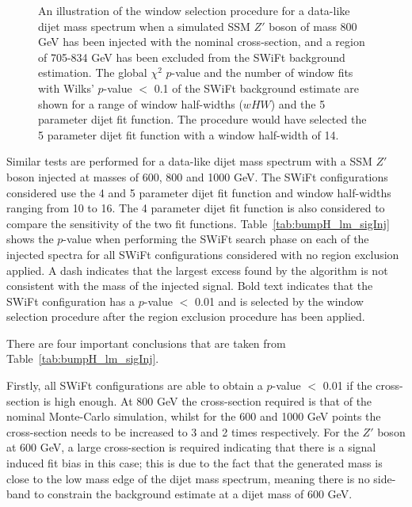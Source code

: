 \begin{figure}[!htb]
        {\label{fig:windowSel_Zprimebb800_xsFactor1}
          An illustration of the window selection procedure for a data-like dijet mass spectrum when
          a simulated SSM $Z'$ boson of mass 800 GeV has been injected with the nominal cross-section,
          and a region of 705-834 GeV has been excluded from the SWiFt background estimation.
          The global $\chi^{2}$ \mbox{$p$-value} %
          and the number of window fits with Wilks' \mbox{$p$-value} $<$ 0.1 of the SWiFt background estimate are shown
          for a range of window half-widths ($wHW$) and the 5 parameter dijet fit function.
          The procedure would have selected the 5 parameter dijet fit function with a window half-width of 14.
}
\end{figure}

\FloatBarrier
Similar tests are performed for a data-like dijet mass spectrum
with a SSM $Z'$ boson injected at masses of 600, 800 and 1000 GeV.
The SWiFt configurations considered use the 4 and 5 parameter dijet fit function and window half-widths ranging from 10 to 16.
The 4 parameter dijet fit function is also considered to compare the sensitivity of the two fit functions.
Table~\ref{tab:bumpH_lm_sigInj} shows the \bh{} \mbox{$p$-value} 
when performing the SWiFt search phase on each of the injected spectra
for all SWiFt configurations considered with no region exclusion applied.
A dash indicates that the largest excess found by the \bh{} algorithm is not consistent with the mass of the injected signal.
Bold text indicates that the SWiFt configuration has a \bh{} $p$-value $<$ 0.01
and is selected by the window selection procedure after the region exclusion procedure has been applied.

\noindent
There are four important conclusions that are taken from Table~\ref{tab:bumpH_lm_sigInj}.

Firstly, all SWiFt configurations are able to obtain a \bh{} $p$-value $<$ 0.01 if the cross-section is high enough.
At 800 GeV the cross-section required is that of the nominal Monte-Carlo simulation, whilst for the 600 and 1000 GeV points
the cross-section needs to be increased to 3 and 2 times respectively.
For the $Z'$ boson at 600 GeV, a large cross-section is required indicating that
there is a signal induced fit bias in this case;
this is due to the fact that the generated mass is close to the low mass edge of the 
dijet mass spectrum, meaning there is no side-band to constrain the background estimate at a dijet mass of 600 GeV.

